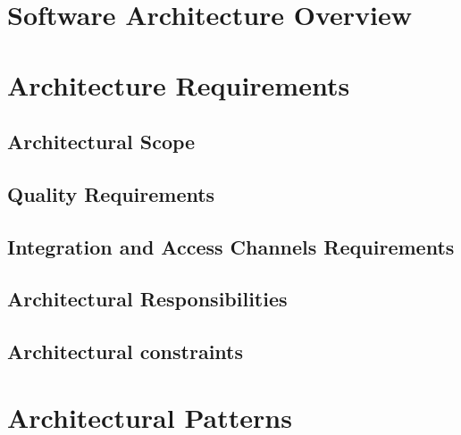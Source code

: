 \documentclass[a4paper,12pt]{article}
\begin{document}
	
	\section{Software Architecture Overview}
	
	
	\section{Architecture Requirements}
	
	
		\subsection{Architectural Scope}
		

		\subsection{Quality Requirements}
		
			
		\subsection{Integration and Access Channels Requirements}
		
		
		\subsection{Architectural Responsibilities}
		
					
		\subsection{Architectural constraints}
		
	
	\section{Architectural Patterns}
	
	
	
	
\end{document}
